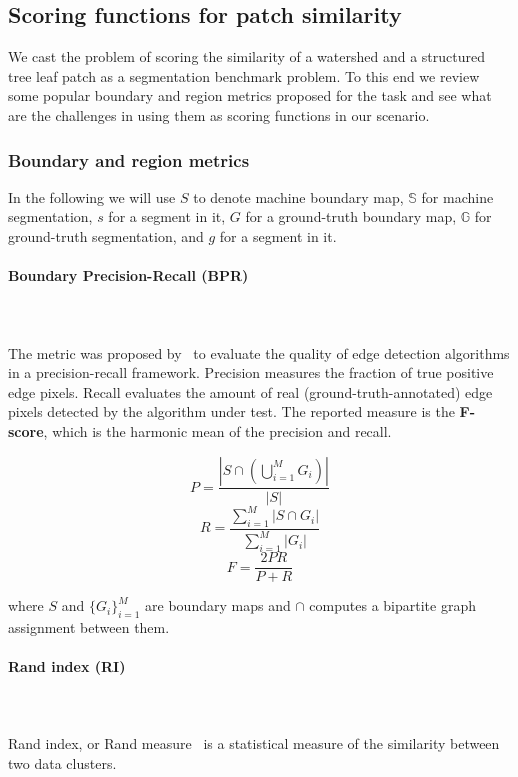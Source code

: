 \subsection{Scoring functions for patch similarity}
We cast the problem of scoring the similarity of a watershed and a structured tree leaf patch as a segmentation benchmark problem. To this end we review some popular boundary and region metrics proposed for the task and see what are the challenges in using them as scoring functions in our scenario.

\subsubsection{Boundary and region metrics}
\label{sec:ch4-boundary-and-region-metrics-maths}
In the following we will use $S$ to denote machine boundary map, $\mathbb{S}$ for machine segmentation, $s$ for a segment in it, $G$ for a ground-truth boundary map, $\mathbb{G}$ for ground-truth segmentation, and $g$ for a segment in it.

\paragraph{Boundary Precision-Recall (BPR)}\mbox{}\\\mbox{}\\ %
The metric was proposed by~\cite{Arbelaez11} to evaluate the quality of edge detection algorithms in a precision-recall framework. Precision measures the fraction of true positive edge pixels. Recall evaluates the amount of real (\eg ground-truth-annotated) edge pixels detected by the algorithm under test. The reported measure is the \textbf{F-score}, which is the harmonic mean of the precision and recall.

\label{sec:ch4-BPR-maths}
\[
P=\frac{\left|S\cap\left(\bigcup\limits _{i=1}^{M}G_{i}\right)\right|}{|S|}
\]
\[
R=\frac{{\sum\limits _{i=1}^{M}\left|S\cap G_{i}\right|}}{\sum\limits _{i=1}^{M}\left|G_{i}\right|}
\]
\[
F=\frac{2PR}{P+R}
\]

where $S$ and $\{G_{i}\}_{i=1}^{M}$ are boundary maps and $\cap$
computes a bipartite graph assignment between them.

\paragraph{Rand index (RI)}\mbox{}\\\mbox{}\\
Rand index, or Rand measure~\cite{rand1971objective} is a statistical measure of the similarity between two data clusters.

